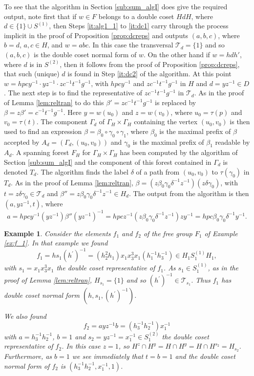 \documentclass[a4paper,12pt]{article}
\renewcommand{\b}{\beta }
\newcommand{\G}{\Gamma }
\newcommand{\g}{\gamma }
\renewcommand{\d}{\delta }
\renewcommand{\t}{\tau }
\newtheorem{exam}[theorem]{Example}
\newenvironment{example}{\begin{exam} \rm}{\end{exam}}
\numberwithin{equation}{section}
\numberwithin{figure}{section}
\newcommand{\cT}{\mathcal{T}}
\begin{document}
To see that the algorithm in Section \ref{sub:sum_algI} does give the 
required output, note first that if $w\in F$ belongs to a double
coset $HdH$, where $d\in \{1\}\cup S^{(1)}$, then Steps \ref{it:alg1_1} to
\ref{it:dc1} carry through the process implicit in the proof of 
Proposition \ref{prop:dcreps} and outputs $(a,b,c)$, where $b=d$, $a,c\in H$,
and $w=abc$. In this case the transversal $\cT_d=\{1\}$ and so 
$(a,b,c)$ is the double coset normal form of $w$. On the other hand
if $w=hdh'$, where $d$ is in $S^{(2)}$, then it follows from the 
proof of Proposition \ref{prop:dcreps}, that such (unique) 
$d$ is found in Step \ref{it:dc2}
of the algorithm. At this point 
$w=hpcy^{-1}\cdot yz^{-1}\cdot zc^{-1}t^{-1}g^{-1}$, with
 $hpcy^{-1}$ and $zc^{-1}t^{-1}g^{-1}$ in $H$ and $d=yz^{-1}\in D$. 
The next step is to find the representative of $zc^{-1}t^{-1}g^{-1}$ 
in $\cT_d$. As in the proof of Lemma \ref{lem:reltran} to do this
$\b'=zc^{-1}t^{-1}g^{-1}$  is replaced by $\b=z\b'= c^{-1}t^{-1}g^{-1}$.
Here $y=w(u_0)$ and $z=w(v_0)$, where $u_0=\t(p)$ and $v_0=\t(t)$.  
The component $\G_d$ of $\G_H\times \G_H$ 
containing the vertex $(u_0,v_0)$ is then
used to find an expression $\b=\b_0\circ \g_0\circ \g_1$, where $\b_0$
is the maximal prefix of $\b$ accepted by $A_d=(\G_d,(u_0,v_0))$ and $\g_0$ is
the maximal prefix of $\b_1$ readable by $A_d$. A spanning forest
$F_H$ for $\G_H\times \G_H$ has been computed by the algorithm of 
Section \ref{sub:sum_algI} and the component of this forest contained
in $\G_d$ is denoted $T_d$. The algorithm finds the label $\d$ of a path
from $(u_0,v_0)$ to $\t(\g_0)$ in $T_d$. As in the proof of Lemma 
\ref{lem:reltran}, $\b=(z\b_0\g_0\d^{-1}z^{-1})(z\d\g_0)$, with
$t=z\d\g_0\in \cT_d$ and $\b''=z\b_0\g_0\d^{-1}z^{-1}\in H_d$. The output
from the algorithm is then $(a,yz^{-1},t)$, where 
\[a=hpcy^{-1}(yz^{-1})\b''(yz^{-1})^{-1}
=hpcz^{-1}(z\b_0\g_0\d^{-1}z^{-1})zy^{-1} =hpc\b_0\g_0\d^{-1}y^{-1}.\]

\begin{example}\label{ex:f_1_again}
Consider the elements 
$f_1$ and $f_2$ of the free group $F_1$ of Example \ref{ex:f_1}. 
In that example we found  
\[f_1=hs_1(h^\prime)^{-1}=(h_2^{2}h_1) x_1x_3^3x_1(h_1^{-1}h_3^{-1})\in H_1S_1^{(1)}H_1,\]
with $s_1=x_1x_3^3x_1$ the double coset representative of $f_1$. 
As $s_1\in S_1^{(1)}$, as in the proof of Lemma \ref{lem:reltran}, 
$H_{s_1}=\{1\}$ and so $(h^\prime)^{-1}\in \cT_{s_1}$. Thus
$f_1$ has double coset normal form $(h, s_1, (h^\prime)^{-1})$.

We also found 
\[f_2=a yz^{-1} b=(h_3^{-1}h_2^{-1}) x_1^{-1}\]
with $a=h_3^{-1}h_2^{-1}$, $b=1$ and $s_2=yz^{-1}= x_1^{-1}\in S_1^{(2)}$ 
 the double coset representative of $f_2$. 
In this case $z=1$, so $H^z\cap H^y=H\cap H^y=H\cap H^{s_2}=H_{s_2}$. 
Furthermore, as $b=1$ we see immediately that $t=b=1$ and the
double coset normal form of $f_2$ is $(h_3^{-1}h_2^{-1}, x_1^{-1}, 1)$.
\end{example}
\end{document}
